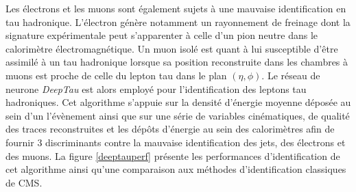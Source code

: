 Les électrons et les muons sont également sujets à une mauvaise identification en tau hadronique. L'électron génère notamment un rayonnement de freinage dont la signature expérimentale peut s'apparenter à celle d'un pion neutre dans le calorimètre électromagnétique. Un muon isolé est quant à lui susceptible d'être assimilé à un tau hadronique lorsque sa position reconstruite dans les chambres à muons est proche de celle du lepton tau dans le plan $(\eta,\phi)$. Le réseau de neurone \textit{DeepTau} \cite{deeptau} est alors employé pour l'identification des leptons tau hadroniques. Cet algorithme s'appuie sur la densité d'énergie moyenne déposée au sein d'un l'évènement ainsi que sur une série de variables cinématiques, de qualité des traces reconstruites et les dépôts d'énergie au sein des calorimètres afin de fournir 3 discriminants contre la mauvaise identification des jets, des électrons et des muons. La figure \ref{deeptauperf} présente les performances d'identification de cet algorithme ainsi qu'une comparaison aux méthodes d'identification classiques de CMS.

